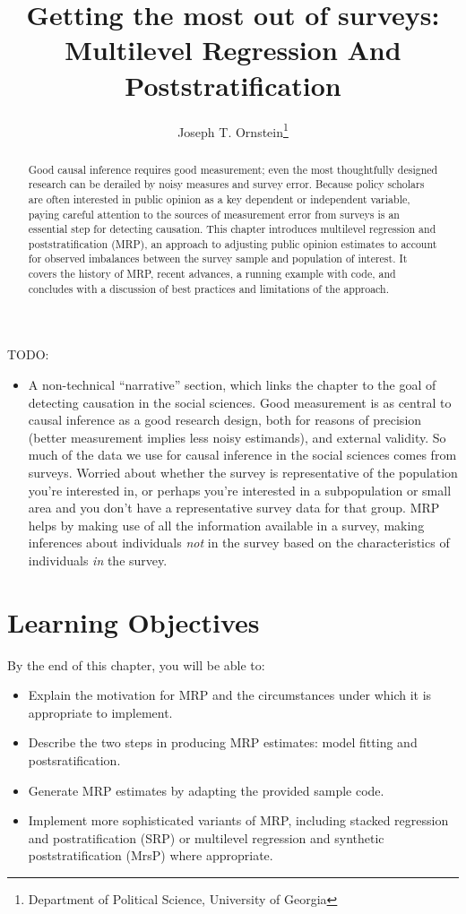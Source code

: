 \documentclass[
]{article}
\title{Getting the most out of surveys: Multilevel Regression And
Poststratification}
\author{Joseph T. Ornstein\footnote{Department of Political Science,
  University of Georgia}}
\date{}
\providecommand{\tightlist}{%
  \setlength{\itemsep}{0pt}\setlength{\parskip}{0pt}}
\begin{document}
\maketitle
\begin{abstract}
Good causal inference requires good measurement; even the most
thoughtfully designed research can be derailed by noisy measures and
survey error. Because policy scholars are often interested in public
opinion as a key dependent or independent variable, paying careful
attention to the sources of measurement error from surveys is an
essential step for detecting causation. This chapter introduces
multilevel regression and poststratification (MRP), an approach to
adjusting public opinion estimates to account for observed imbalances
between the survey sample and population of interest. It covers the
history of MRP, recent advances, a running example with code, and
concludes with a discussion of best practices and limitations of the
approach.
\end{abstract}

TODO:

\begin{itemize}
\tightlist
\item
  A non-technical ``narrative'' section, which links the chapter to the
  goal of detecting causation in the social sciences. Good measurement
  is as central to causal inference as a good research design, both for
  reasons of precision (better measurement implies less noisy
  estimands), and external validity. So much of the data we use for
  causal inference in the social sciences comes from surveys. Worried
  about whether the survey is representative of the population you're
  interested in, or perhaps you're interested in a subpopulation or
  small area and you don't have a representative survey data for that
  group. MRP helps by making use of all the information available in a
  survey, making inferences about individuals \emph{not} in the survey
  based on the characteristics of individuals \emph{in} the survey.
\end{itemize}

\hypertarget{learning-objectives}{%
\section{Learning Objectives}\label{learning-objectives}}

By the end of this chapter, you will be able to:

\begin{itemize}
\item
  Explain the motivation for MRP and the circumstances under which it is
  appropriate to implement.
\item
  Describe the two steps in producing MRP estimates: model fitting and
  postsratification.
\item
  Generate MRP estimates by adapting the provided sample code.
\item
  Implement more sophisticated variants of MRP, including stacked
  regression and postratification (SRP) or multilevel regression and
  synthetic poststratification (MrsP) where appropriate.
\end{itemize}
\end{document}
